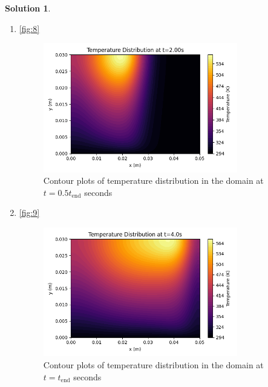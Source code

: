 \documentclass[12pt]{article}
\theoremstyle{definition} %
\newtheorem{solution}{Solution}
\theoremstyle{plain} %
\begin{document}
\begin{solution}
\begin{enumerate}
\begin{enumerate}
\begin{figure}[htbp]
            \label{fig:7}
        \end{figure}
        \item \autoref{fig:8} \begin{figure}[htbp]
            \centering
            \includegraphics[width=0.8\textwidth]{classes/tam-470/06-10/proj-2.3.3.png}
            \caption{Contour plots of temperature distribution in the domain at $t = 0.5t_\text{end}$ seconds}
            \label{fig:8}
        \end{figure}
    \item \autoref{fig:9} \begin{figure}[htbp]
        \centering
        \includegraphics[width=0.8\textwidth]{classes/tam-470/06-10/proj-2.3.4.png}
        \caption{Contour plots of temperature distribution in the domain at $t = t_\text{end}$ seconds}
        \label{fig:9}
    \end{figure}
        \end{enumerate}

\end{enumerate}
\end{solution}
\end{document}
